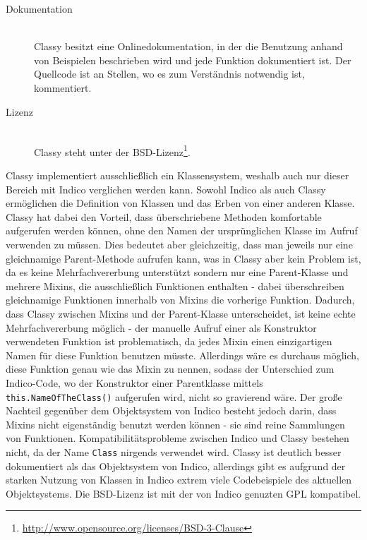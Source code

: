 \begin{description}
\item[Dokumentation] \hfill \\
Classy besitzt eine Onlinedokumentation, in der die Benutzung anhand von Beispielen beschrieben
wird und jede Funktion dokumentiert ist. Der Quellcode ist an Stellen, wo es zum Verständnis
notwendig ist, kommentiert.

\item[Lizenz] \hfill \\
Classy steht unter der
BSD-Lizenz\footnote{\href{http://www.opensource.org/licenses/BSD-3-Clause}{http://www.opensource.org/licenses/BSD-3-Clause}}.
\end{description}

Classy implementiert ausschließlich ein Klassensystem, weshalb auch nur dieser Bereich mit Indico
verglichen werden kann. Sowohl Indico als auch Classy ermöglichen die Definition von Klassen und das
Erben von einer anderen Klasse. Classy hat dabei den Vorteil, dass überschriebene Methoden
komfortable aufgerufen werden können, ohne den Namen der ursprünglichen Klasse im Aufruf verwenden
zu müssen. Dies bedeutet aber gleichzeitig, dass man jeweils nur eine gleichnamige Parent-Methode
aufrufen kann, was in Classy aber kein Problem ist, da es keine Mehrfachvererbung unterstützt
sondern nur eine Parent-Klasse und mehrere Mixins, die ausschließlich Funktionen enthalten - dabei
überschreiben gleichnamige Funktionen innerhalb von Mixins die vorherige Funktion. Dadurch, dass
Classy zwischen Mixins und der Parent-Klasse unterscheidet, ist keine echte Mehrfachvererbung
möglich - der manuelle Aufruf einer als Konstruktor verwendeten Funktion ist problematisch, da jedes
Mixin einen einzigartigen Namen für diese Funktion benutzen müsste. Allerdings wäre es durchaus
möglich, diese Funktion genau wie das Mixin zu nennen, sodass der Unterschied zum Indico-Code, wo
der Konstruktor einer Parentklasse mittels \lstinline{this.NameOfTheClass()} aufgerufen wird, nicht
so gravierend wäre. Der große Nachteil gegenüber dem Objektsystem von Indico besteht jedoch darin,
dass Mixins nicht eigenständig benutzt werden können - sie sind reine Sammlungen von Funktionen.
Kompatibilitätsprobleme zwischen Indico und Classy bestehen nicht, da der Name \lstinline{Class}
nirgends verwendet wird. Classy ist deutlich besser dokumentiert als das Objektsystem von Indico,
allerdings gibt es aufgrund der starken Nutzung von Klassen in Indico extrem viele Codebeispiele des
aktuellen Objektsystems. Die BSD-Lizenz ist mit der von Indico genuzten GPL kompatibel.




